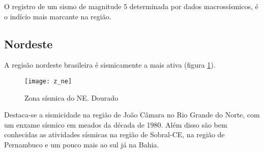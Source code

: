O registro de um sismo de magnitude 5 determinada por dados macrossísmicos,
é o indício mais marcante na região.


\subsection{Nordeste}
\label{sec:z_ne}

A regisão nordeste brasileira é sismicamente a mais ativa (figura \ref{fig:z_ne}). 

\begin{figure}[H]
  \centering
  \texttt{[image: z\_ne]} 
  \caption{Zona sísmica do NE. Dourado}
  \label{fig:z_ne} 
\end{figure}

Destaca-se a sismicidade na região de João Câmara no Rio Grande do Norte,
com um enxame sísmico em meados da década de 1980. 
Além disso são bem conhecidas as atividades sísmicas na região de Sobral-CE,
na região de Pernambuco e um pouco mais ao sul já na Bahia.



